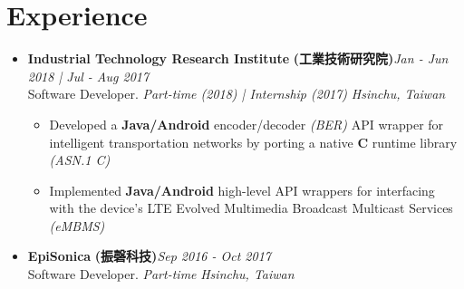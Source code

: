 \section{\sectionheading Experience}

\begin{itemize}[leftmargin=0pt, label={}]%

\item{
{\sectionheading\large{\textbf{Industrial Technology Research Institute}}} \textbf{(工業技術研究院)}\hfill {\sectionheading\small{\textit{Jan - Jun 2018 | Jul - Aug 2017}}}\\
{\sectionheading\small{Software Developer. \textit{Part-time (2018) | Internship (2017)}}}\hfill
{\sectionheading\small{\textit{Hsinchu, Taiwan}}}

    \vspace{-6pt}
    \begin{itemize}[label=\textbullet, leftmargin=*, noitemsep]
        \item{Developed a \textbf{Java/Android} encoder/decoder \textit{(BER)} API wrapper for intelligent transportation networks by porting a native \textbf{C} runtime library \textit{(ASN.1 C)}}
        \item{Implemented \textbf{Java/Android} high-level API wrappers for interfacing with the device's LTE Evolved Multimedia Broadcast Multicast Services \textit{(eMBMS)}}
    \end{itemize}
}

\item{
{\sectionheading\large{\textbf{EpiSonica}}} \textbf{(振磬科技)}\hfill {\sectionheading\small{\textit{Sep 2016 - Oct 2017}}}\\
{\sectionheading\small{Software Developer. \textit{Part-time}}}\hfill
{\sectionheading\small{\textit{Hsinchu, Taiwan}}}

}
\end{itemize}
